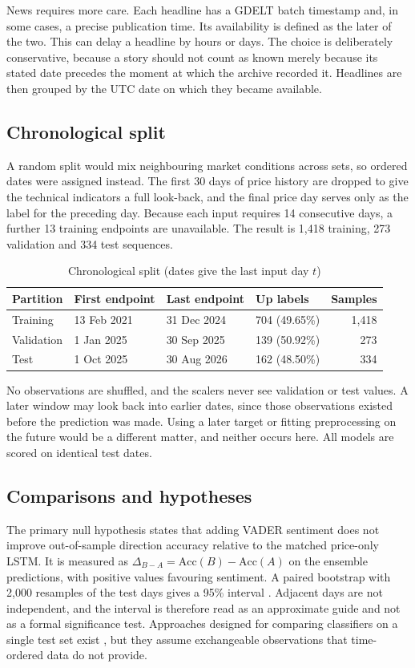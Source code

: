 News requires more care. Each headline has a GDELT batch timestamp and, in some cases, a precise publication time. Its availability is defined as the later of the two. This can delay a headline by hours or days. The choice is deliberately conservative, because a story should not count as known merely because its stated date precedes the moment at which the archive recorded it. Headlines are then grouped by the UTC date on which they became available.

\subsection{Chronological split}
A random split would mix neighbouring market conditions across sets, so ordered dates were assigned instead. The first 30 days of price history are dropped to give the technical indicators a full look-back, and the final price day serves only as the label for the preceding day. Because each input requires 14 consecutive days, a further 13 training endpoints are unavailable. The result is 1,418 training, 273 validation and 334 test sequences.

\begin{table}[htbp]\centering
\caption{Chronological split (dates give the last input day $t$)}\label{tab:split}
\begin{tabular}{llllr}
\toprule
Partition & First endpoint & Last endpoint & Up labels & Samples\\\midrule
Training & 13 Feb 2021 & 31 Dec 2024 & 704 (49.65\%) & 1,418\\
Validation & 1 Jan 2025 & 30 Sep 2025 & 139 (50.92\%) & 273\\
Test & 1 Oct 2025 & 30 Aug 2026 & 162 (48.50\%) & 334\\
\bottomrule
\end{tabular}
\end{table}

No observations are shuffled, and the scalers never see validation or test values. A later window may look back into earlier dates, since those observations existed before the prediction was made. Using a later target or fitting preprocessing on the future would be a different matter, and neither occurs here. All models are scored on identical test dates.

\subsection{Comparisons and hypotheses}
The primary null hypothesis states that adding VADER sentiment does not improve out-of-sample direction accuracy relative to the matched price-only LSTM. It is measured as $\Delta_{B-A}=\mathrm{Acc}(B)-\mathrm{Acc}(A)$ on the ensemble predictions, with positive values favouring sentiment. A paired bootstrap with 2,000 resamples of the test days gives a 95\% interval \cite{efron1993}. Adjacent days are not independent, and the interval is therefore read as an approximate guide and not as a formal significance test. Approaches designed for comparing classifiers on a single test set exist \cite{dietterich1998}, but they assume exchangeable observations that time-ordered data do not provide.


